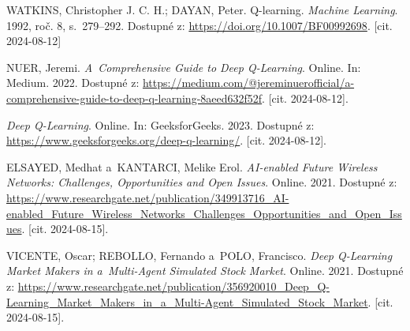 WATKINS, Christopher J. C. H.; DAYAN, Peter. Q-learning. \textit{Machine Learning}. 1992, roč. 8, s.~279–292. Dostupné z: \url{https://doi.org/10.1007/BF00992698}. [cit. 2024-08-12]

NUER, Jeremi. \textit{A~Comprehensive Guide to Deep Q-Learning}. Online. In: Medium. 2022. Dostupné z: \url{https://medium.com/@jereminuerofficial/a-comprehensive-guide-to-deep-q-learning-8aeed632f52f}. [cit. 2024-08-12].

\textit{Deep Q-Learning}. Online. In: GeeksforGeeks. 2023. Dostupné z: \url{https://www.geeksforgeeks.org/deep-q-learning/}. [cit. 2024-08-12].

ELSAYED, Medhat a~KANTARCI, Melike Erol. \textit{AI-enabled Future Wireless Networks: Challenges, Opportunities and Open Issues}. Online. 2021. Dostupné z: \url{https://www.researchgate.net/publication/349913716_AI-enabled_Future_Wireless_Networks_Challenges_Opportunities_and_Open_Issues}. [cit. 2024-08-15].

VICENTE, Oscar; REBOLLO, Fernando a~POLO, Francisco. \textit{Deep Q-Learning Market Makers in a~Multi-Agent Simulated Stock Market}. Online. 2021. Dostupné z: \url{https://www.researchgate.net/publication/356920010_Deep_Q-Learning_Market_Makers_in_a_Multi-Agent_Simulated_Stock_Market}. [cit. 2024-08-15].
